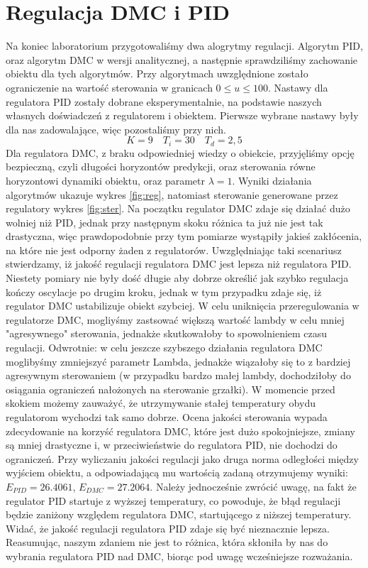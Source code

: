 \chapter{Regulacja DMC i PID}
Na koniec laboratorium przygotowaliśmy dwa alogrytmy regulacji. Algorytm PID,
oraz algorytm DMC w wersji analitycznej, a następnie sprawdziliśmy
zachowanie obiektu dla tych algorytmów. Przy algorytmach uwzględnione
zostało ograniczenie na wartość sterowania w granicach $0 \leq u \leq 100$.
Nastawy dla regulatora PID zostały dobrane eksperymentalnie, na podstawie
naszych własnych doświadczeń z regulatorem i obiektem. Pierwsze wybrane
nastawy były dla nas zadowalające, więc pozostaliśmy przy nich.
\begin{equation}
  K = 9 \quad T_i = 30 \quad T_d = 2,5
\end{equation}
Dla regulatora DMC, z braku odpowiedniej wiedzy o obiekcie,
przyjęliśmy opcję bezpieczną, czyli długości horyzontów predykcji,
oraz sterowania równe horyzontowi dynamiki obiektu, oraz parametr $\lambda = 1$.
Wyniki działania algorytmów ukazuje wykres \ref{fig:reg}, natomiast sterowanie
generowane przez regulatory wykres \ref{fig:ster}. Na początku regulator
DMC zdaje się działać dużo wolniej niż PID, jednak przy następnym skoku
różnica ta już nie jest tak drastyczna, więc prawdopodobnie przy tym pomiarze
wystąpiły jakieś zakłócenia, na które nie jest odporny żaden z regulatorów.
Uwzględniając taki scenariusz stwierdzamy, iż jakość regulacji regulatora
DMC jest lepsza niż regulatora PID. Niestety pomiary nie były dość długie aby
dobrze określić jak szybko regulacja kończy oscylacje po drugim kroku, jednak
w tym przypadku zdaje się, iż regulator DMC ustabilizuje obiekt szybciej.
W celu uniknięcia przeregulowania w regulatorze DMC, mogliyśmy zastsować 
większą wartość lambdy w celu mniej "agresywnego" sterowania, jednakże 
skutkowałoby to spowolnieniem czasu regulacji. Odwrotnie: w celu jeszcze szybszego
działania regulatora DMC moglibyśmy zmniejszyć parametr Lambda, jednakże wiązałoby
się to z bardziej agresywnym sterowaniem (w przypadku bardzo małej lambdy, dochodziłoby
do osiągania ograniczeń nałożonych na sterowanie grzałki). 
W momencie przed skokiem możemy zauważyć, że utrzymywanie stałej temperatury
obydu regulatorom wychodzi tak samo dobrze. Ocena jakości sterowania wypada
zdecydowanie na korzyść regulatora DMC, które jest dużo spokojniejsze, zmiany
są mniej drastyczne i, w przeciwieństwie do regulatora PID, nie dochodzi do
ograniczeń. Przy wyliczaniu jakości regulacji jako druga norma odległości
między wyjściem obiektu, a odpowiadającą mu wartością zadaną otrzymujemy
wyniki: $E_{PID} = 26.4061$, $E_{DMC} = 27.2064$. Należy jednocześnie zwrócić
uwagę, na fakt że regulator PID startuje z wyższej temperatury, co powoduje,
że błąd regulacji będzie zaniżony względem regulatora DMC, startującego z niższej 
temperatury. Widać, że jakość regulacji
regulatora PID zdaje się być nieznacznie lepsza. Reasumując, naszym zdaniem nie jest to
różnica, która skłoniła by nas do wybrania regulatora PID nad DMC, biorąc
pod uwagę wcześniejsze rozważania.

